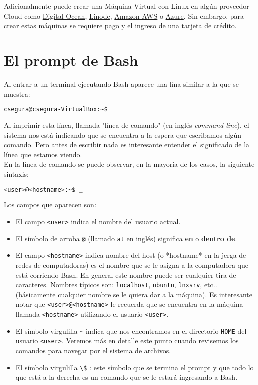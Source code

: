 \documentclass[10pt,letterpaper]{article}
\begin{document}
Adicionalmente puede crear una Máquina Virtual con Linux en algún proveedor Cloud como \href{https://www.digitalocean.com/}{Digital Ocean}, \href{https://www.linode.com/}{Linode}, \href{https://aws.amazon.com}{Amazon AWS} o \href{https://azure.microsoft.com/}{Azure}. Sin embargo, para crear estas máquinas se requiere pago y el ingreso de una tarjeta de crédito.



\section{El prompt de Bash}

Al entrar a un terminal ejecutando Bash aparece una lína similar a la que se muestra:

\begin{lstlisting}[language=Bash]
csegura@csegura-VirtualBox:~$
\end{lstlisting}
Al imprimir esta línea, llamada "línea de comando" (en inglés \textit{command line}), el sistema nos está indicando que se encuentra a la espera que escribamos algún comando. Pero antes de escribir nada es interesante entender el significado de la línea que estamos viendo.
\\
En la línea de comando se puede observar, en la mayoría de los casos, la siguiente sintaxis:

\begin{lstlisting}[language=Bash]
<user>@<hostname>:~$ _
\end{lstlisting}

Los campos que aparecen son:

\begin{itemize}

\item  El campo \verb+<user>+ indica el nombre del usuario actual.

\item  El símbolo de arroba \verb+@+ (llamado \verb+at+ en inglés) significa \textbf{en} o \textbf{dentro de}.

\item  El campo \verb+<hostname>+ indica nombre del host (o *hostname* en la jerga de redes de computadoras) es el nombre que se le asigna a la computadora que está corriendo Bash. En general este nombre puede ser cualquier tira de caracteres. Nombres típicos son: \verb+localhost+, \verb+ubuntu+, \verb+lnxsrv+, etc.. (básicamente cualquier nombre se le quiera dar a la máquina). Es interesante notar que \verb+<user>@<hostname>+ le recuerda que se encuentra en la máquina llamada \verb+<hostname>+ utilizando el usuario \verb+<user>+.

\item  El símbolo virgulilla \verb+~+ indica que nos encontramos en el directorio \verb+HOME+ del usuario \verb+<user>+. Veremos más en detalle este punto cuando revisemos los comandos para navegar por el sistema de archivos.

\item El símbolo virgulilla \verb+\$+ : este símbolo que se termina el prompt y que todo lo que está a la derecha es un comando que se le estará ingresando a Bash.

\end{itemize}
\end{document}
